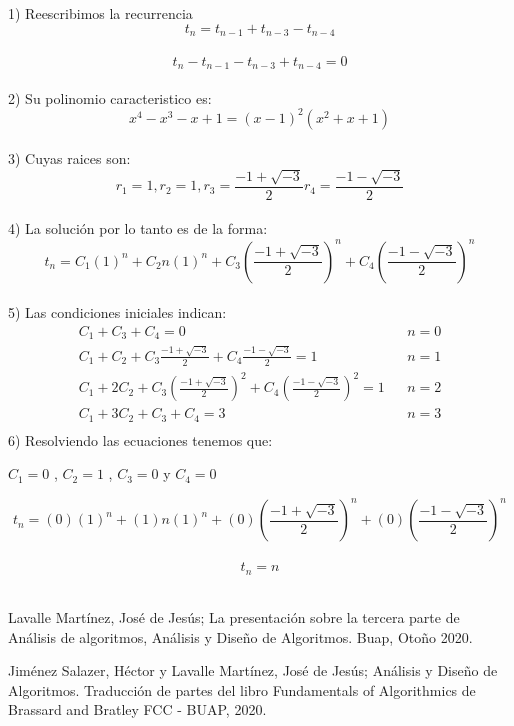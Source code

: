 \documentclass{article}
\theoremstyle{definition}
\theoremstyle{remark}
\begin{document}
\begin{enumerate}[1.]
1) Reescribimos la recurrencia \\
$$ t_n = t_{n-1}+t_{n-3}-t_{n-4} $$\\
$$ t_n-t_{n-1}-t_{n-3}+t_{n-4}= 0 $$\\
2) Su polinomio caracteristico es:\\
$$ x^{4}-x^{3}-x+1 = (x-1)^{2}(x^{2}+x+1)$$\\
3) Cuyas raices son:\\ 
$$ r_1=1 , r_2=1, r_3 =\frac{-1+ \sqrt{-3}}{2}  r_4=\frac{-1-\sqrt{-3}}{2}$$\\
4) La soluci\'on por lo tanto es de la forma:\\
$$t_n = C_1(1)^{n} + C_2n(1)^{n} + C_3(\frac{-1+ \sqrt{-3}}{2})^{n} + C_4(\frac{-1-\sqrt{-3}}{2})^{n}$$\\
5) Las condiciones iniciales indican: \\
\begin{align*}
C_{1}+C_{3}+C_{4}=0& & n=0\\
C_{1}+C_{2}+C_{3}\frac{-1+ \sqrt{-3}}{2} +C_{4}\frac{-1- \sqrt{-3}}{2} =1& & n=1\\
C_{1}+2C_{2}+C_{3}(\frac{-1+ \sqrt{-3}}{2})^2 +C_{4}(\frac{-1- \sqrt{-3}}{2})^2 =1& & n=2\\
C_{1}+3C_2 +C_{3}+C_{4}=3& & n=3\\
\end{align*}
6) Resolviendo las ecuaciones tenemos que:\\
\begin{center}
$C_1=0$ , $C_2=1$ , $C_3=0 $ y $C_4=0 $
\end{center}
$$t_n = (0)(1)^{n} + (1)n(1)^{n} + (0)(\frac{-1+ \sqrt{-3}}{2})^{n} + (0)(\frac{-1- \sqrt{-3}}{2})^{n}$$\\
$$t_n = n$$\\
\clearpage



\end{enumerate}


\clearpage

\pagebreak 
\begin{thebibliography}{99}
 Lavalle Mart\'inez, Jos\'e de Jes\'us; La presentaci\'on sobre la tercera
parte de An\'alisis de algoritmos, An\'alisis y Dise\~{n}o de Algoritmos.
Buap, Oto\~{n}o 2020.

 Jim\'enez Salazer, H\'ector y Lavalle Mart\'inez, Jos\'e de Jes\'us; An\'alisis y Dise\~{n}o de Algoritmos. Traducci\'on de partes del libro Fundamentals of Algorithmics de Brassard and Bratley FCC - BUAP, 2020.





\end{thebibliography}
\end{document}

